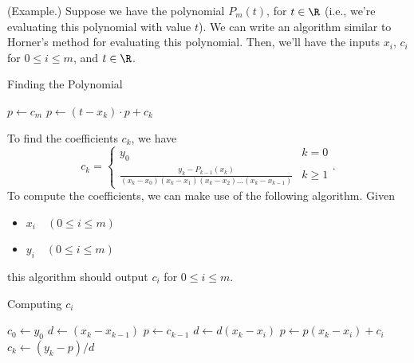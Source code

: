 \documentclass[letterpaper]{article}
\begin{document}
\begin{mdframed}
    (Example.) Suppose we have the polynomial $P_{m}(t)$, for $t \in \R$ (i.e., we're evaluating this polynomial with value $t$). We can write an algorithm similar to Horner's method for evaluating this polynomial. Then, we'll have the inputs $x_i$, $c_i$ for $0 \leq i \leq m$, and $t \in \R$. 
    \begin{algorithm}[H]
        \caption{Finding the Polynomial}
        \label{alg:two}
        \begin{algorithmic}[1]
            \State $p \gets c_m$
                \State $p \gets (t - x_k) \cdot p + c_k$
            \EndFor 
        \end{algorithmic}
    \end{algorithm}
\end{mdframed}
To find the coefficients $c_k$, we have 
\begin{equation}
    c_k = \begin{cases}
        y_0 & k = 0 \\ 
        \frac{y_k - P_{k - 1}(x_k)}{(x_k - x_0)(x_k - x_1)(x_k - x_2) \hdots (x_k - x_{k - 1})} & k \geq 1
    \end{cases}.
\end{equation}
To compute the coefficients, we can make use of the following algorithm. Given 
\begin{itemize}
    \item $x_i \quad (0 \leq i \leq m)$
    \item $y_i \quad (0 \leq i \leq m)$
\end{itemize}
this algorithm should output $c_i$ for $0 \leq i \leq m$. 
\begin{algorithm}[H]
    \caption{Computing $c_i$}
    \begin{algorithmic}[1]
        \State $c_0 \gets y_0$
            \State $d \gets (x_k - x_{k - 1})$
            \State $p \gets c_{k - 1}$
                \State $d \gets d(x_k - x_i)$ 
                \State $p \gets p(x_k - x_i) + c_i$  
            \EndFor 
            \State $c_k \gets (y_k - p) / d$
        \EndFor 
    \end{algorithmic}
\end{algorithm}
\end{document}
